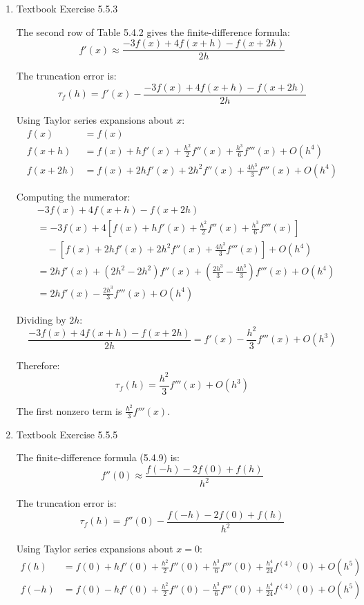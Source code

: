\documentclass[reqno]{exam}
\begin{document}
\begin{enumerate}
\begin{solution}
The first two nonzero terms are $-\frac{h^2}{6}f'''(x)$ and $-\frac{h^4}{120}f^{(5)}(x)$.
\end{solution}

\item Textbook Exercise 5.5.3
\begin{solution}
The second row of Table 5.4.2 gives the finite-difference formula:
$$f'(x) \approx \frac{-3f(x) + 4f(x+h) - f(x+2h)}{2h}$$

The truncation error is:
$$\tau_f(h) = f'(x) - \frac{-3f(x) + 4f(x+h) - f(x+2h)}{2h}$$

Using Taylor series expansions about $x$:
\begin{align*}
f(x) &= f(x)\\
f(x+h) &= f(x) + hf'(x) + \frac{h^2}{2}f''(x) + \frac{h^3}{6}f'''(x) + O(h^4)\\
f(x+2h) &= f(x) + 2hf'(x) + 2h^2f''(x) + \frac{4h^3}{3}f'''(x) + O(h^4)
\end{align*}

Computing the numerator:
\begin{align*}
&-3f(x) + 4f(x+h) - f(x+2h)\\
&= -3f(x) + 4\left[f(x) + hf'(x) + \frac{h^2}{2}f''(x) + \frac{h^3}{6}f'''(x)\right]\\
&\quad - \left[f(x) + 2hf'(x) + 2h^2f''(x) + \frac{4h^3}{3}f'''(x)\right] + O(h^4)\\
&= 2hf'(x) + (2h^2 - 2h^2)f''(x) + \left(\frac{2h^3}{3} - \frac{4h^3}{3}\right)f'''(x) + O(h^4)\\
&= 2hf'(x) - \frac{2h^3}{3}f'''(x) + O(h^4)
\end{align*}

Dividing by $2h$:
$$\frac{-3f(x) + 4f(x+h) - f(x+2h)}{2h} = f'(x) - \frac{h^2}{3}f'''(x) + O(h^3)$$

Therefore:
$$\boxed{\tau_f(h) = \frac{h^2}{3}f'''(x) + O(h^3)}$$

The first nonzero term is $\frac{h^2}{3}f'''(x)$.
\end{solution}

\item Textbook Exercise 5.5.5

\begin{solution}
The finite-difference formula (5.4.9) is:
$$f''(0) \approx \frac{f(-h) - 2f(0) + f(h)}{h^2}$$

The truncation error is:
$$\tau_f(h) = f''(0) - \frac{f(-h) - 2f(0) + f(h)}{h^2}$$

Using Taylor series expansions about $x = 0$:
\begin{align*}
f(h) &= f(0) + hf'(0) + \frac{h^2}{2}f''(0) + \frac{h^3}{6}f'''(0) + \frac{h^4}{24}f^{(4)}(0) + O(h^5)\\
f(-h) &= f(0) - hf'(0) + \frac{h^2}{2}f''(0) - \frac{h^3}{6}f'''(0) + \frac{h^4}{24}f^{(4)}(0) + O(h^5)
\end{align*}


\end{solution}
\end{enumerate}
\end{document}

